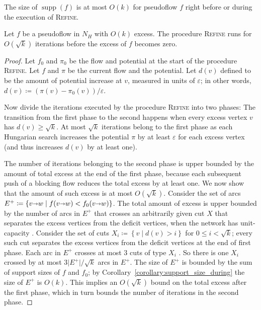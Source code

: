 \documentclass[a4paper,UKenglish]{socg-lipics-v2018}
\makeatletter
\def\note#1{\textcolor{red}{{#1}}}
\def\etal{\emph{et~al.}}
\def\etal{\textit{et~al.}}
\def\eps{\varepsilon}
\def\abs#1{\mathopen| #1 \mathclose|}		%
\def\Set#1{\left\{ #1 \right\}}
\def\arcto{\mathord\shortrightarrow}
\def\arc#1#2{#1\arcto#2}
\def\supp{\operatorname{supp}}
\theoremstyle{plain}
\numberwithin{figure}{section}
\def\EMPH#1{\textbf{\emph{\boldmath #1}}}
\def\n@te#1{\textsf{\boldmath \textbf{$\langle\!\langle$#1$\rangle\!\rangle$}}\leavevmode}
\def\note#1{\textcolor{red}{\n@te{#1}}}
\makeatother
\begin{document}
\begin{corollary}
\label{corollary:support_size_during}
The size of $\supp(f)$ is at most $O(k)$ for pseudoflow $f$ right before or during the execution of \textsc{Refine}.
\end{corollary}


\begin{lemmarep}
\label{lemma:goldberg_refine_iterations}
Let $f$ be a pseudoflow in $N_H$ with $O(k)$ excess.
The procedure \textsc{Refine} runs for $O(\sqrt{k})$ iterations
before the excess of $f$ becomes zero.
\end{lemmarep}

\begin{proof}
Let $f_0$ and $\pi_0$ be the flow and potential at the start of the procedure \textsc{Refine}.  Let $f$ and $\pi$ be the current flow and the potential.
Let \EMPH{$d(v)$} defined to be the amount of potential increase at $v$, measured in units of $\eps$; in other words, $d(v) \coloneqq (\pi(v) - \pi_0(v)) / \eps$.
%

Now divide the iterations executed by
the procedure \textsc{Refine}
into two phases:  The transition from the first phase to the second happens when every excess vertex $v$ has $d(v) \ge \sqrt{k}$.
%
At most $\sqrt{k}$ iterations belong to
the first phase as each Hungarian search increases the potential $\pi$ by at least $\eps$ for each excess vertex (and thus increases $d(v)$ by at least one).

The number of iterations
belonging to the second phase is upper bounded by the amount of total excess at the end of the first phase, because each subsequent push of a blocking flow reduces the total excess by at least one.  We now show that the amount of such excess is at most $O(\sqrt{k})$.
%
Consider the set of arcs $E^+ \coloneqq \Set{\arc vw \mid f(\arc vw) < f_0(\arc vw)}$.
The total amount of excess is upper bounded by the number of arcs in $E^+$ that crosses an arbitrarily given cut $X$ that separates the excess vertices from the deficit vertices, when the network has unit-capacity \cite[Lemma~3.6]{GHKT17}.
%
Consider the set of cuts $X_i \coloneqq \Set{v \mid d(v) > i}$ for $0 \le i < \sqrt{k}$; every such cut separates the excess vertices from the deficit vertices at the end of first phase.
Each arc in $E^+$ crosses at most $3$ cuts of type $X_i$ \cite[Lemma~3.1]{GHKT17}.  So there is one $X_i$ crossed by at most $3\abs{E^+}/\sqrt{k}$ arcs in $E^+$.
%
The size of $E^+$ is bounded by the sum of support sizes of $f$ and $f_0$; by Corollary~\ref{corollary:support_size_during} the size of $E^+$ is $O(k)$.
This implies an $O(\sqrt{k})$ bound on the total excess after the first phase, which in turn bounds the number of iterations in the second phase.
\end{proof}
\end{document}
